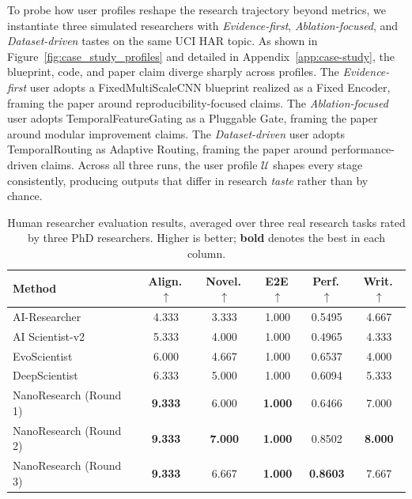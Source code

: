 \documentclass{opendatalab}
\begin{document}
To probe how user profiles reshape the research trajectory beyond metrics,
we instantiate three simulated researchers with \emph{Evidence-first},
\emph{Ablation-focused}, and \emph{Dataset-driven} tastes on the same UCI HAR topic.
As shown in Figure~\ref{fig:case_study_profiles} and detailed in
Appendix~\ref{app:case-study}, the blueprint, code, and paper claim
diverge sharply across profiles. The \emph{Evidence-first} user adopts a
FixedMultiScaleCNN blueprint realized as a Fixed Encoder, framing the
paper around reproducibility-focused claims. The \emph{Ablation-focused}
user adopts TemporalFeatureGating as a Pluggable Gate, framing the paper
around modular improvement claims. The \emph{Dataset-driven} user adopts
TemporalRouting as Adaptive Routing, framing the paper around
performance-driven claims. Across all three runs, the user profile $\mathcal{U}$ shapes every stage
consistently, producing outputs that differ in research \emph{taste}
rather than by chance.
\begin{table}[!t]
  \centering
  \small
  \setlength{\tabcolsep}{5.1mm}
  \caption{Human researcher evaluation results, averaged over three
  real research tasks rated by three PhD researchers. Higher is better;
  \textbf{bold} denotes the best in each column.}
  \begin{tabular}{l|ccccc}
    \toprule
    Method
      & Align.\,$\uparrow$
      & Novel.\,$\uparrow$
      & E2E\,$\uparrow$
      & Perf.\,$\uparrow$
      & Writ.\,$\uparrow$ \\
    \midrule
    AI-Researcher           & 4.333 & 3.333 & 1.000 & 0.5495 & 4.667 \\
    AI Scientist-v2         & 5.333 & 4.000 & 1.000 & 0.4965 & 4.333 \\
    EvoScientist            & 6.000 & 4.667 & 1.000 & 0.6537 & 4.000 \\
    DeepScientist           & 6.333 & 5.000 & 1.000 & 0.6094 & 5.333 \\
    \midrule
    NanoResearch (Round 1)  & \textbf{9.333} & 6.000 & \textbf{1.000} & 0.6466 & 7.000 \\
    NanoResearch (Round 2)  & \textbf{9.333} & \textbf{7.000} & \textbf{1.000} & 0.8502 & \textbf{8.000} \\
    NanoResearch (Round 3)  & \textbf{9.333} & 6.667 & \textbf{1.000} & \textbf{0.8603} & 7.667 \\
    \bottomrule
  \end{tabular}
  \label{tab:user_study}
\end{table}
\end{document}
